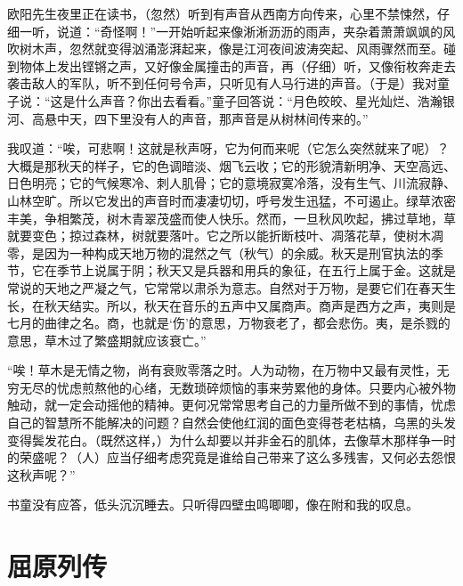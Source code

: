 \documentclass[12pt,UTF-8,openany,a4]{ctexbook}
\begin{document}
\begin{large}
    \yiwen 
    欧阳先生夜里正在读书，（忽然）听到有声音从西南方向传来，心里不禁悚然，仔细一听，说道：“奇怪啊！”一开始听起来像淅淅沥沥的雨声，夹杂着萧萧飒飒的风吹树木声，忽然就变得汹涌澎湃起来，像是江河夜间波涛突起、风雨骤然而至。碰到物体上发出铿锵之声，又好像金属撞击的声音，再（仔细）听，又像衔枚奔走去袭击敌人的军队，听不到任何号令声，只听见有人马行进的声音。（于是）我对童子说：“这是什么声音？你出去看看。”童子回答说：“月色皎皎、星光灿烂、浩瀚银河、高悬中天，四下里没有人的声音，那声音是从树林间传来的。”
    
    我叹道：“唉，可悲啊！这就是秋声呀，它为何而来呢（它怎么突然就来了呢）？大概是那秋天的样子，它的色调暗淡、烟飞云收；它的形貌清新明净、天空高远、日色明亮；它的气候寒冷、刺人肌骨；它的意境寂寞冷落，没有生气、川流寂静、山林空旷。所以它发出的声音时而凄凄切切，呼号发生迅猛，不可遏止。绿草浓密丰美，争相繁茂，树木青翠茂盛而使人快乐。然而，一旦秋风吹起，拂过草地，草就要变色；掠过森林，树就要落叶。它之所以能折断枝叶、凋落花草，使树木凋零，是因为一种构成天地万物的混然之气（秋气）的余威。秋天是刑官执法的季节，它在季节上说属于阴；秋天又是兵器和用兵的象征，在五行上属于金。这就是常说的天地之严凝之气，它常常以肃杀为意志。自然对于万物，是要它们在春天生长，在秋天结实。所以，秋天在音乐的五声中又属商声。商声是西方之声，夷则是七月的曲律之名。商，也就是‘伤’的意思，万物衰老了，都会悲伤。夷，是杀戮的意思，草木过了繁盛期就应该衰亡。”
    
    “唉！草木是无情之物，尚有衰败零落之时。人为动物，在万物中又最有灵性，无穷无尽的忧虑煎熬他的心绪，无数琐碎烦恼的事来劳累他的身体。只要内心被外物触动，就一定会动摇他的精神。更何况常常思考自己的力量所做不到的事情，忧虑自己的智慧所不能解决的问题？自然会使他红润的面色变得苍老枯槁，乌黑的头发变得鬓发花白。（既然这样，）为什么却要以并非金石的肌体，去像草木那样争一时的荣盛呢？（人）应当仔细考虑究竟是谁给自己带来了这么多残害，又何必去怨恨这秋声呢？”
    
    书童没有应答，低头沉沉睡去。只听得四壁虫鸣唧唧，像在附和我的叹息。
    
\end{large}



\chapter{屈原列传}
\end{document}
